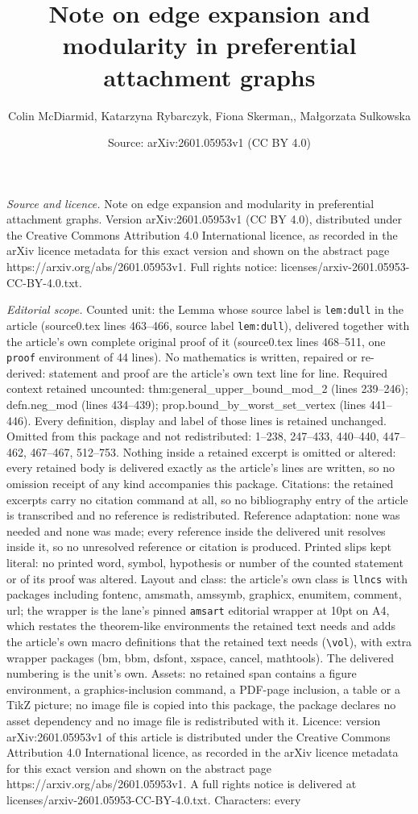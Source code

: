 \documentclass[10pt,a4paper]{amsart}
\title[Note on edge expansion and modularity in preferential attach]{Note on edge expansion and modularity in preferential attachment graphs}
\author{Colin McDiarmid, Katarzyna Rybarczyk, Fiona Skerman,, Ma{\l}gorzata Sulkowska}
\date{Source: arXiv:2601.05953v1 (CC BY 4.0)}
\begin{document}
\maketitle

\noindent\emph{Source and licence.} Note on edge expansion and modularity in preferential attachment graphs. Version arXiv:2601.05953v1 (CC BY 4.0), distributed under the Creative Commons Attribution 4.0 International licence, as recorded in the arXiv licence metadata for this exact version and shown on the abstract page https://arxiv.org/abs/2601.05953v1. Full rights notice: licenses/arxiv-2601.05953-CC-BY-4.0.txt.\par\smallskip

\noindent\textit{Editorial scope.} Counted unit: the Lemma whose source label is \texttt{lem:dull} in the article (source0.tex lines 463--466, source label \texttt{lem:dull}), delivered together with the article's own complete original proof of it (source0.tex lines 468--511, one \texttt{proof} environment of 44 lines). No mathematics is written, repaired or re-derived: statement and proof are the article's own text line for line. Required context retained uncounted: thm:general\_upper\_bound\_mod\_2 (lines 239--246); defn.neg\_mod (lines 434--439); prop.bound\_by\_worst\_set\_vertex (lines 441--446). Every definition, display and label of those lines is retained unchanged. Omitted from this package and not redistributed: 1--238, 247--433, 440--440, 447--462, 467--467, 512--753. Nothing inside a retained excerpt is omitted or altered: every retained body is delivered exactly as the article's lines are written, so no omission receipt of any kind accompanies this package. Citations: the retained excerpts carry no citation command at all, so no bibliography entry of the article is transcribed and no reference is redistributed. Reference adaptation: none was needed and none was made; every reference inside the delivered unit resolves inside it, so no unresolved reference or citation is produced. Printed slips kept literal: no printed word, symbol, hypothesis or number of the counted statement or of its proof was altered. Layout and class: the article's own class is \texttt{llncs} with packages including fontenc, amsmath, amssymb, graphicx, enumitem, comment, url; the wrapper is the lane's pinned \texttt{amsart} editorial wrapper at 10pt on A4, which restates the theorem-like environments the retained text needs and adds the article's own macro definitions that the retained text needs (\texttt{\textbackslash vol}), with extra wrapper packages (bm, bbm, dsfont, xspace, cancel, mathtools). The delivered numbering is the unit's own. Assets: no retained span contains a figure environment, a graphics-inclusion command, a PDF-page inclusion, a table or a TikZ picture; no image file is copied into this package, the package declares no asset dependency and no image file is redistributed with it. Licence: version arXiv:2601.05953v1 of this article is distributed under the Creative Commons Attribution 4.0 International licence, as recorded in the arXiv licence metadata for this exact version and shown on the abstract page https://arxiv.org/abs/2601.05953v1. A full rights notice is delivered at licenses/arxiv-2601.05953-CC-BY-4.0.txt. Characters: every 
\end{document}
